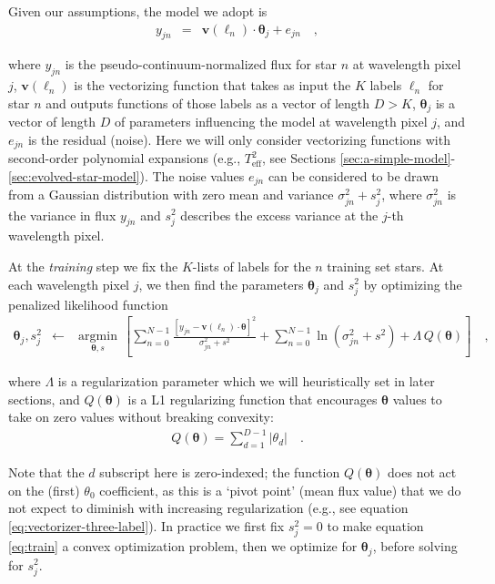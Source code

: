 \documentclass[preprint,trackchanges]{aastex}
\newcommand{\teff}{T_{\mathrm{eff}}}
\newcommand{\Dvector}[1]{\boldsymbol{#1}}
\newcommand{\vectheta}{\Dvector{\theta}}
\newcommand{\vecv}{\Dvector{v}}
\newcommand{\argmin}[1]{\underset{#1}{\operatorname{argmin}}\,}
\begin{document}
\noindent{}Given our assumptions, the model we adopt is
\begin{eqnarray}\label{eq:model}
y_{jn} & = & \vecv(\ell_n)\cdot\vectheta_j + e_{jn}\quad ,
\end{eqnarray}

\noindent{}where $y_{jn}$ is the pseudo-continuum-normalized flux for star $n$ at wavelength pixel
$j$, $\vecv(\ell_n)$ is the vectorizing function that takes as input the $K$ labels
$\ell_n$ for star $n$ and outputs functions of those labels as a vector of length
$D>K$, $\vectheta_j$ is a vector of length $D$ of parameters influencing the model at
wavelength pixel $j$, and $e_{jn}$ is the residual (noise).  Here we will only consider
vectorizing functions with second-order polynomial expansions (e.g., $\teff^2$, see Sections 
\ref{sec:a-simple-model}-\ref{sec:evolved-star-model}).  The noise values $e_{jn}$ can 
be considered to be drawn from a Gaussian distribution with zero mean and variance 
$\sigma_{jn}^2 + s_j^2$, where $\sigma_{jn}^2$ is the variance in flux $y_{jn}$ and 
$s_j^2$ describes the excess variance at the $j$-th wavelength pixel. 


At the \emph{training} step we fix the $K$-lists of labels for the $n$ training set stars.
At each wavelength pixel $j$, we then find the parameters $\vectheta_j$ and $s_j^2$
by optimizing the penalized likelihood function
\begin{eqnarray}\label{eq:train}
\vectheta_j,s^2_j &\leftarrow& \argmin{\vectheta,s}\left[
    \sum_{n=0}^{N-1} \frac{[y_{jn}-\vecv(\ell_n)\cdot\vectheta]^2}{\sigma^2_{jn}+s^2}
    + \sum_{n=0}^{N-1} \ln(\sigma^2_{jn}+s^2) + \Lambda{}\,Q(\vectheta)
    \right]
  \quad ,
\end{eqnarray}

\noindent{}where $\Lambda$ is a regularization parameter which we will heuristically set
in later sections, and $Q(\vectheta)$ is a L1 regularizing function that encourages 
$\vectheta$ values to take on zero values without breaking convexity:
\begin{eqnarray}\label{eq:regularization-function}
	Q(\vectheta) = \sum_{d=1}^{D-1} |{\theta_d}| \quad .
\end{eqnarray}

Note that the $d$ subscript here is zero-indexed; the function $Q(\vectheta)$ does not act
on the (first) $\theta_0$ coefficient, as this is a `pivot point' (mean flux value) that 
we do not expect to diminish with increasing regularization (e.g., see equation 
\ref{eq:vectorizer-three-label}).  In practice we first fix $s_j^2 = 0$ to make equation
\ref{eq:train} a convex optimization problem, then we optimize for $\vectheta_j$, before 
solving for $s_j^2$.  
\end{document}
